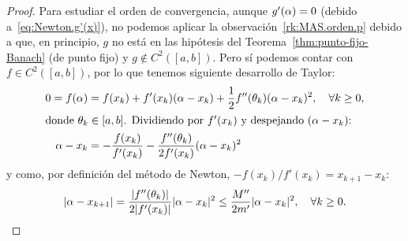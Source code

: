 \begin{proof}
  Para estudiar el orden de convergencia, aunque $g'(\alpha)=0$ (debido
  a~\eqref{eq:Newton.g'(x)}), no podemos aplicar la
  observación~\ref{rk:MAS.orden.p} debido a que, en principio, $g$ no
  está en las hipótesis del Teorema~\ref{thm:punto-fijo-Banach} (de
  punto fijo) y $g\not\in C^2([a,b])$. Pero sí podemos contar con
  $f\in C^2([a,b])$, por lo que tenemos siguiente desarrollo de
  Taylor:
  \begin{align*}
    0 = f(\alpha)&=f(x_k)+f'(x_k)(\alpha-x_k)+\frac12 f''(\theta_k)(\alpha-x_k)^2,
                  \quad\forall k\ge 0,
    \\
    \intertext{donde $\theta_k\in [a,b]$. Dividiendo por $f'(x_k)$ y despejando $(\alpha-x_k)$:}
    \alpha - x_k &=  -\frac{f(x_k)}{f'(x_k)} -\frac{f''(\theta_k)}{2f'(x_k)}(\alpha-x_k)^2
  \end{align*}
  y como, por definición del método de Newton,
  $-f(x_k)/f'(x_k)=x_{k+1}-x_k$:
  \begin{equation*}
    |\alpha-x_{k+1}| =  \frac{|f''(\theta_k)|}{2|f'(x_k)|}|\alpha-x_k|^2 \le \frac{M''}{2m'} |\alpha-x_k|^2,
    \quad\forall k\ge 0.
  \end{equation*}
\end{proof}

